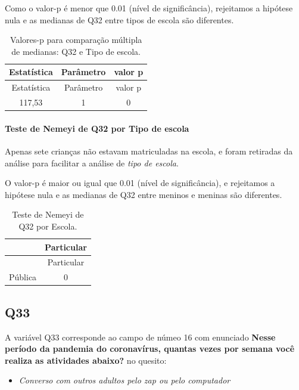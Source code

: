 \documentclass[]{article}
\providecommand{\tightlist}{%
  \setlength{\itemsep}{0pt}\setlength{\parskip}{0pt}}
\let\oldparagraph\paragraph
\renewcommand{\paragraph}[1]{\oldparagraph{#1}\mbox{}}
\begin{document}
Como o valor-p é menor que 0.01 (nível de significância), rejeitamos a hipótese nula e as medianas de Q32 entre tipos de escola são diferentes.

\begin{longtable}[]{@{}ccc@{}}
\caption{\label{tab:unnamed-chunk-1121}Valores-p para comparação múltipla de medianas: Q32 e Tipo de escola.}\tabularnewline
\toprule
Estatística & Parâmetro & valor p\tabularnewline
\midrule
\endfirsthead
\toprule
Estatística & Parâmetro & valor p\tabularnewline
\midrule
\endhead
117,53 & 1 & 0\tabularnewline
\bottomrule
\end{longtable}

\hypertarget{teste-de-nemeyi-de-q32-por-tipo-de-escola}{%
\paragraph{Teste de Nemeyi de Q32 por Tipo de escola}\label{teste-de-nemeyi-de-q32-por-tipo-de-escola}}

Apenas sete crianças não estavam matriculadas na escola, e foram retiradas da análise para facilitar a análise de \emph{tipo de escola}.

O valor-p é maior ou igual que 0.01 (nível de significância), e rejeitamos a hipótese nula e as medianas de Q32 entre meninos e meninas são diferentes.

\begin{longtable}[]{@{}lc@{}}
\caption{\label{tab:unnamed-chunk-1123}Teste de Nemeyi de Q32 por Escola.}\tabularnewline
\toprule
& Particular\tabularnewline
\midrule
\endfirsthead
\toprule
& Particular\tabularnewline
\midrule
\endhead
Pública & 0\tabularnewline
\bottomrule
\end{longtable}

\cleardoublepage

\hypertarget{q33}{%
\subsection{Q33}\label{q33}}

A variável Q33 corresponde ao campo de númeo 16 com enunciado \textbf{Nesse período da pandemia do coronavírus, quantas vezes por semana você realiza as atividades abaixo?} no quesito:

\begin{itemize}
\tightlist
\item
  \emph{Converso com outros adultos pelo zap ou pelo computador}
\end{itemize}
\end{document}
